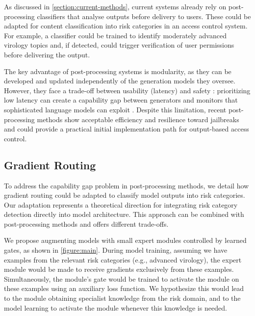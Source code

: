 \documentclass{article}
\theoremstyle{plain}
\theoremstyle{definition}
\theoremstyle{remark}
\begin{document}
As discussed in \cref{section:current-methods}, current systems
already rely on post-processing classifiers that analyse outputs
before delivery to users.
These could be adapted for content classification into risk
categories in an access control system.
For example, a classifier could be trained to identify moderately
advanced virology topics and, if detected, could trigger verification
of user permissions before delivering the output.

The key advantage of post-processing systems is modularity, as they
can be developed and updated independently of the generation models
they oversee.
However, they face a trade-off between usability (latency) and safety
\cite{kumar2025freelunchguardrails}: prioritizing low latency can
create a capability gap between generators and monitors that
sophisticated language models can exploit
\cite{jin2024jailbreakinglargelanguagemodels}.
Despite this limitation, recent post-processing methods show
acceptable efficiency and resilience toward jailbreaks
\cite{sharma2025constitutionalclassifiersdefendinguniversal} and
could provide a practical initial implementation path for
output-based access control.

\subsection{Gradient Routing} \label{section:gradient-routing}

To address the capability gap problem in post-processing methods, we
detail how gradient routing \cite{cloud2024gradientroutingmaskinggradients}
could be adapted to classify model outputs into risk categories.
Our adaptation represents a theoretical direction for integrating
risk category detection directly into model architecture.
This approach can be combined with post-processing methods and offers
different trade-offs.

We propose augmenting models with small expert modules controlled by
learned gates, as shown in \cref{figure:main}.
During model training, assuming we have examples from the relevant
risk categories (e.g., advanced virology), the expert module would be
made to receive gradients exclusively from these examples.
Simultaneously, the module's gate would be trained to activate the
module on these examples using an auxiliary loss function.
We hypothesize this would lead to the module obtaining specialist
knowledge from the risk domain, and to the model learning to activate
the module whenever this knowledge is needed.
\end{document}
